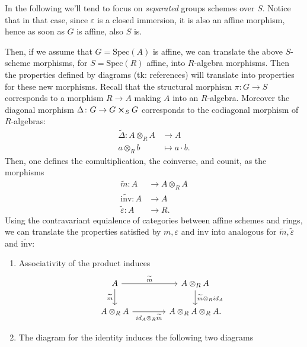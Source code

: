 \documentclass[../Main]{subfiles}
\begin{document}
In the following we'll tend to focus on {\em separated} groups schemes over $S$.
Notice that in that case, since $\varepsilon$ is a closed immersion, it is also an affine morphism,
hence as soon as $G$ is affine, also $S$ is.
\begin{rem}[]
	Then, if we assume that $G = \mathrm{Spec}(A)$ is affine, we can translate the above $S$-scheme
	morphisms, for $S = \mathrm{Spec}(R)$ affine, into $R$-algebra morphisms.
	Then the properties defined by diagrams (tk: references) will translate into properties
	for these new morphisms.
	Recall that the structural morphism $\pi\colon G \to S$ corresponds to a
	morphism $R \to A$ making $A$ into an $R$-algebra.
	Moreover the diagonal morphism $\Delta\colon G \to G \cross_{ S } G$ corresponds
	to the codiagonal morphism of $R$-algebras:
	\begin{align}
		\widetilde{\Delta}\colon A \otimes_R A &\longrightarrow A \\
		a \otimes_R b &\longmapsto a \cdot b \nonumber
	.\end{align} 
	Then, one defines the comultiplication, the coinverse, and counit, as the morphisms
	\begin{align}
		\widetilde{m}\colon A &\longrightarrow A \otimes_R A \\
		\widetilde{\mathrm{inv}}\colon A &\longrightarrow A \\
		\widetilde{\varepsilon}\colon A &\longrightarrow R
	.\end{align} 
	Using the contravariant equialence of categories between affine schemes and
	rings, we can translate the properties satisfied by $m, \varepsilon$ and $\mathrm{inv}$
	into analogous for $\widetilde{m}, \widetilde{\varepsilon}$ and $\widetilde{\mathrm{inv}}$:
	\begin{enumerate}
		\item Associativity of the product induces
			\begin{equation}
			\begin{tikzcd}[column sep=4em]
				A \arrow[r, "\widetilde{m}", rightarrow] 
				\arrow[d, "\widetilde{m}"', rightarrow] &
				A \otimes_R A \arrow[d, "\widetilde{m} \otimes_R id_A", rightarrow] \\
				A \otimes_R A \arrow[r, "id_A \otimes_R \widetilde{m}"', rightarrow] &
				A \otimes_R A \otimes_R A.
			\end{tikzcd}
			\end{equation} 
		\item The diagram for the identity induces the following two diagrams

\end{enumerate}
\end{rem}
\end{document}
